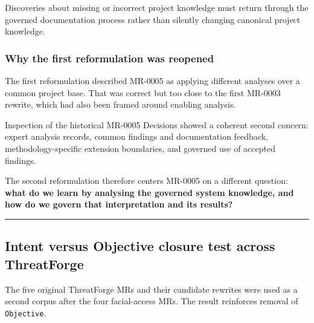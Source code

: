 \documentclass[
  10pt,
]{article}
\begin{document}
Discoveries about missing or incorrect project knowledge must return
through the governed documentation process rather than silently changing
canonical project knowledge.

\subsubsection{Why the first reformulation was
reopened}\label{why-the-first-reformulation-was-reopened-1}

The first reformulation described MR-0005 as applying different analyses
over a common project base. That was correct but too close to the first
MR-0003 rewrite, which had also been framed around enabling analysis.

Inspection of the historical MR-0005 Decisions showed a coherent second
concern: expert analysis records, common findings and documentation
feedback, methodology-specific extension boundaries, and governed use of
accepted findings.

The second reformulation therefore centers MR-0005 on a different
question: \textbf{what do we learn by analysing the governed system
knowledge, and how do we govern that interpretation and its results?}

\begin{center}\rule{0.5\linewidth}{0.5pt}\end{center}

\subsection{Intent versus Objective closure test across
ThreatForge}\label{intent-versus-objective-closure-test-across-threatforge}

The five original ThreatForge MRs and their candidate rewrites were used
as a second corpus after the four facial-access MRs. The result
reinforces removal of \texttt{Objective}.
\end{document}

